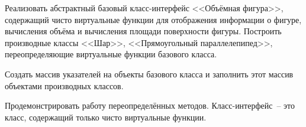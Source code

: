 Реализовать абстрактный базовый класс-интерфейс
<<Объёмная фигура>>, содержащий чисто виртуальные
функции для отображения информации о фигуре,
вычисления объёма и вычисления площади поверхности
фигуры. Построить производные классы <<Шар>>,
<<Прямоугольный параллелепипед>>, переопределяющие
виртуальные функции базового класса.

Создать массив
указателей на объекты базового класса и заполнить этот
массив объектами производных классов.

Продемонстрировать работу переопределённых методов.
Класс-интерфейс~-- это класс, содержащий только чисто
виртуальные функции.
